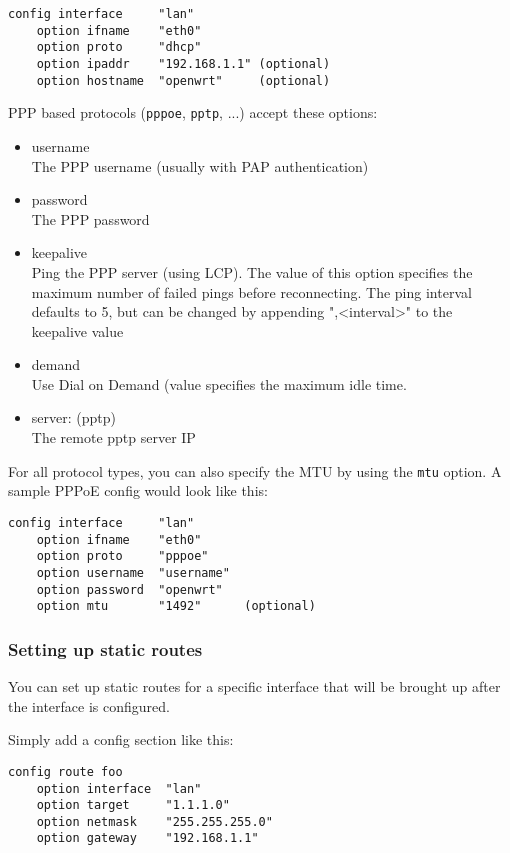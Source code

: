 \begin{Verbatim}
config interface     "lan"
    option ifname    "eth0"
    option proto     "dhcp"
    option ipaddr    "192.168.1.1" (optional)
    option hostname  "openwrt"     (optional)
\end{Verbatim}

PPP based protocols (\texttt{pppoe}, \texttt{pptp}, ...) accept these options:
\begin{itemize}
    \item{username} \\
        The PPP username (usually with PAP authentication)
    \item{password} \\
        The PPP password
    \item{keepalive} \\
        Ping the PPP server (using LCP). The value of this option
        specifies the maximum number of failed pings before reconnecting.
        The ping interval defaults to 5, but can be changed by appending
        ",<interval>" to the keepalive value
    \item{demand} \\
        Use Dial on Demand (value specifies the maximum idle time.
    \item{server: (pptp)} \\
        The remote pptp server IP
\end{itemize}

For all protocol types, you can also specify the MTU by using the \texttt{mtu} option.
A sample PPPoE config would look like this:

\begin{Verbatim}
config interface     "lan"
    option ifname    "eth0"
    option proto     "pppoe"
    option username  "username"
    option password  "openwrt"
    option mtu       "1492"      (optional)
\end{Verbatim}

\subsubsection{Setting up static routes}

You can set up static routes for a specific interface that will be brought up 
after the interface is configured.

Simply add a config section like this:

\begin{Verbatim}
config route foo
	option interface  "lan"
	option target     "1.1.1.0"
	option netmask    "255.255.255.0"
	option gateway    "192.168.1.1"
\end{Verbatim}

